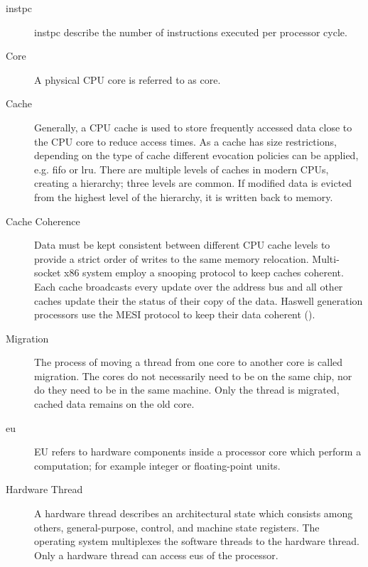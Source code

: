 \begin{description}
  \item[\Gls{instpc}] \Gls{instpc} describe the number of instructions executed
    per processor cycle.


  \item[Core] A physical CPU core is referred to as core.

  \item[Cache] Generally, a CPU cache is used to store frequently accessed data
    close to the CPU core to reduce access times.
    As a cache has size restrictions, depending on the type of cache different
    evocation policies can be applied, e.g. \gls{fifo} or \gls{lru}.
    There are multiple levels of caches in modern CPUs, creating a hierarchy;
    three levels are common.
    If modified data is evicted from the highest level of the hierarchy, it is
    written back to memory.

  \item[Cache Coherence] Data must be kept consistent between different CPU
    cache levels to provide a strict order of writes to the same memory
    relocation.
    Multi-socket x86 system employ a snooping protocol to keep caches coherent.
    Each cache broadcasts every update over the address bus and all other
    caches update their the status of their copy of the data.
    Haswell generation processors use the MESI protocol to keep their data
    coherent (\cite[2-22]{intel_optimization_manual_2015}).

  \item[Migration] The process of moving a thread from one core to another core
    is called migration.
    The cores do not necessarily need to be on the same chip, nor do they need
    to be in the same machine. Only the thread is migrated, cached data remains
    on the old core.

  \item[\Gls{eu}] EU refers to hardware components inside a
    processor core which perform a computation; for example integer or
    floating-point units.

  \item[Hardware Thread] A hardware thread describes an architectural state
    which consists among others, general-purpose, control, and machine state
    registers.
    The operating system multiplexes the software threads to the hardware
    thread.
    Only a hardware thread can access \gls{eu}s of the processor.


\end{description}
